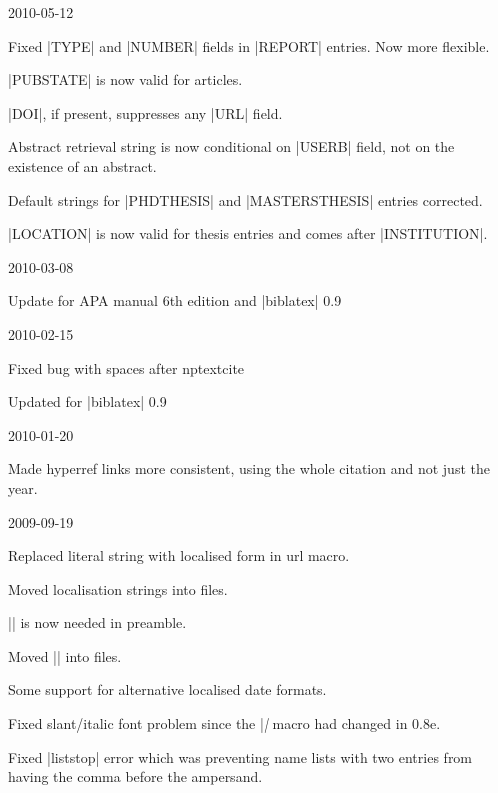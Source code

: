 \documentclass{ltxdockit}
\begin{document}
\begin{changelog}
\begin{release}{1.0}{2010-05-12}
\item Fixed |TYPE| and |NUMBER| fields in |REPORT| entries. Now more
  flexible.
\item |PUBSTATE| is now valid for articles.
\item |DOI|, if present, suppresses any |URL| field.
\item Abstract retrieval string is now conditional on |USERB| field, not on
  the existence of an abstract.
\item Default strings for |PHDTHESIS| and |MASTERSTHESIS| entries corrected.
\item |LOCATION| is now valid for thesis entries and comes after |INSTITUTION|.
\end{release}

\begin{release}{0.9}{2010-03-08}
\item Update for APA manual 6th edition and |biblatex| 0.9
\end{release}

\begin{release}{0.8}{2010-02-15}
\item Fixed bug with spaces after nptextcite
\item Updated for |biblatex| 0.9
\end{release}

\begin{release}{0.7}{2010-01-20}
\item Made hyperref links more consistent, using the whole citation and not
  just the year.
\end{release}


\begin{release}{0.5}{2009-09-19}
\item Replaced literal string with localised form in url macro.
\item Moved localisation strings into  files.
\item |\DeclareLanguageMapping| is now needed in preamble.
\item Moved |\DeclareBibliographyExtras| into  files.
\item Some support for alternative localised date formats.
\item Fixed slant/italic font problem since the |\mkbibemph| macro had
  changed in  0.8e.
\item Fixed |liststop| error which was preventing name lists with two
  entries from having the comma before the ampersand.
\end{release}


\end{changelog}
\end{document}

